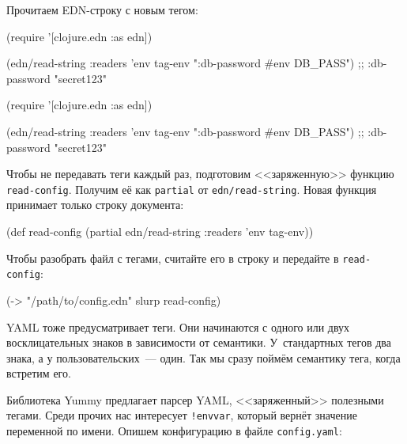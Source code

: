 \fi

\noindent
Прочитаем EDN-строку с новым тегом:

\ifnarrow

\begin{english}
  \begin{clojure}
(require '[clojure.edn :as edn])

(edn/read-string
  {:readers {'env tag-env}}
  "{:db-password #env DB_PASS}")
;; {:db-password "secret123"}
  \end{clojure}
\end{english}

\else

\begin{english}
  \begin{clojure}
(require '[clojure.edn :as edn])

(edn/read-string {:readers {'env tag-env}}
                 "{:db-password #env DB_PASS}")
;; {:db-password "secret123"}
  \end{clojure}
\end{english}

\fi

Чтобы не передавать теги каждый раз, подготовим <<заряженную>> функцию
\verb|read-config|. Получим её как \verb|partial| от \verb|edn/read-string|.
Новая функция принимает только строку документа:

\begin{english}
  \begin{clojure}
(def read-config
  (partial edn/read-string
           {:readers {'env tag-env}}))
  \end{clojure}
\end{english}

Чтобы разобрать файл с тегами, считайте его в строку и передайте в
\verb|read-config|:

\begin{english}
  \begin{clojure}
(-> "/path/to/config.edn"
    slurp
    read-config)
  \end{clojure}
\end{english}

YAML тоже предусматривает теги. Они начинаются с одного или двух восклицательных
знаков в зависимости от семантики. У~стандартных тегов два знака, а у
пользовательских~--- один. Так мы сразу поймём семантику тега, когда встретим
его.


Библиотека Yummy предлагает парсер YAML, <<заряженный>> полезными тегами. Среди
прочих нас интересует \verb|!envvar|, который вернёт значение переменной по
имени. Опишем конфигурацию в файле \verb|config.yaml|:


